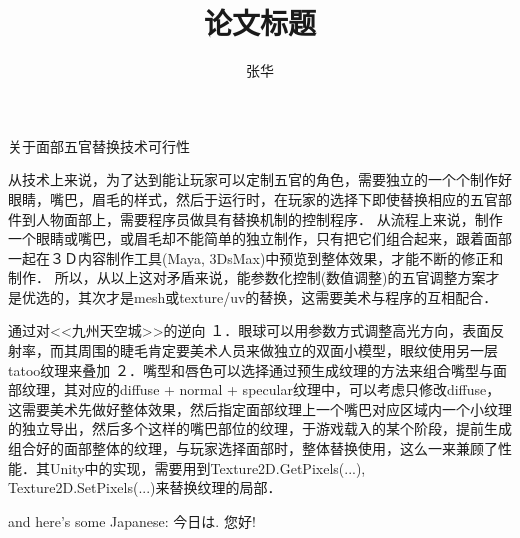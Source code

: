 \documentclass[12pt]{paper}
\title{\C 论文标题}
\author{\C 张华}
\begin{document}
\maketitle




{\C
	关于面部五官替换技术可行性

从技术上来说，为了达到能让玩家可以定制五官的角色，需要独立的一个个制作好眼睛，嘴巴，眉毛的样式，然后于运行时，在玩家的选择下即使替换相应的五官部件到人物面部上，需要程序员做具有替换机制的控制程序．
从流程上来说，制作一个眼睛或嘴巴，或眉毛却不能简单的独立制作，只有把它们组合起来，跟着面部一起在３Ｄ内容制作工具(Maya, 3DsMax)中预览到整体效果，才能不断的修正和制作．
所以，从以上这对矛盾来说，能参数化控制(数值调整)的五官调整方案才是优选的，其次才是mesh或texture/uv的替换，这需要美术与程序的互相配合．

通过对<<九州天空城>>的逆向
１．眼球可以用参数方式调整高光方向，表面反射率，而其周围的睫毛肯定要美术人员来做独立的双面小模型，眼纹使用另一层tatoo纹理来叠加
２．嘴型和唇色可以选择通过预生成纹理的方法来组合嘴型与面部纹理，其对应的diffuse + normal + specular纹理中，可以考虑只修改diffuse，这需要美术先做好整体效果，然后指定面部纹理上一个嘴巴对应区域内一个小纹理的独立导出，然后多个这样的嘴巴部位的纹理，于游戏载入的某个阶段，提前生成组合好的面部整体的纹理，与玩家选择面部时，整体替换使用，这么一来兼顾了性能．其Unity中的实现，需要用到Texture2D.GetPixels(...), Texture2D.SetPixels(...)来替换纹理的局部．
}
and here's some Japanese: {\J 今日は}.
{\C 您好!}
\end{document}
